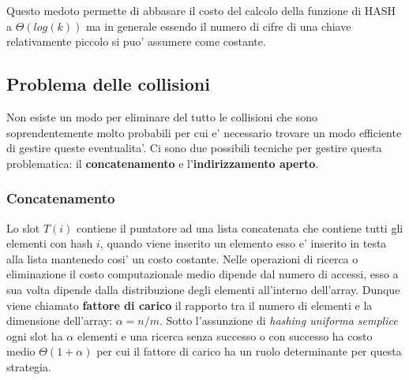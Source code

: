 \documentclass{article}
\begin{document}
Questo medoto permette di abbasare il costo del calcolo della funzione di HASH a $\Theta(log(k))$ ma in generale essendo il numero di cifre di una 
chiave relativamente piccolo si puo' assumere come costante.

\subsection{Problema delle collisioni}
Non esiste un modo per eliminare del tutto le collisioni che sono soprendentemente molto probabili per cui e' necessario trovare un modo efficiente di gestire queste eventualita'. Ci sono due possibili tecniche per gestire questa problematica: il \textbf{concatenamento} e l'\textbf{indirizzamento aperto}.

\subsubsection{Concatenamento}
Lo slot $T(i)$ contiene il puntatore ad una lista concatenata che contiene tutti gli elementi con hash $i$, quando viene inserito un elemento esso e' inserito in testa alla lista mantenedo cosi' un costo costante.
Nelle operazioni di ricerca o eliminazione il costo computazionale medio dipende dal numero di accessi, esso a sua volta dipende dalla distribuzione degli elementi all'interno dell'array.
Dunque viene chiamato \textbf{fattore di carico} il rapporto tra il numero di elementi e la dimensione dell'array: $\alpha=n/m$. 
Sotto l'assunzione di \textit{hashing uniforma semplice} ogni slot ha $\alpha$ elementi e una ricerca senza successo o con successo ha costo medio $\Theta(1+\alpha)$ per cui il fattore di carico ha un ruolo determinante per questa strategia.
\end{document}
